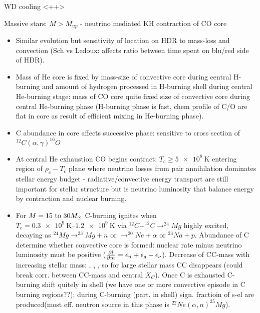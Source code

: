 \begin{frame}{WD cooling}
    <++>
\end{frame}

\begin{frame}{Massive stars: $M>M_{up}$ - neutrino mediated KH contraction of CO core}
    \begin{itemize}
        \item Similar evolution but sensitivity of location on HDR to mass-loss and convection (Sch vs Ledoux: affects ratio between time spent on blu/red side of HDR).
        \item Mass of He core is fixed by mass-size of convective core during central H-burning and amount of hydrogen processed in H-burning shell during central He-burning stage: mass of CO core quite fixed size of convective core during central He-burning phase (H-burning phase is fast, chem profile of C/O are flat in core as result of efficient mixing in He-burning phase).
        \item C abundance in core affects successive phase: sensitive to cross section of $^{12}C(\alpha,\gamma)^{16}O$
        \item At central He exhaustion CO begins contract; $T_c\geq\SI{5e8}{\kelvin}$ entering region of $\rho_c-T_c$ plane where neutrino losses from pair annihilation dominates stellar energy budget - radiative/convective energy transport are still important for stellar structure but is neutrino luminosity that balance energy by contraction and nuclear burning.
        \item For $M=\numrange{15}{30}\msun{}$ C-burning ignites when $T_c=\SIrange{0.3e9}{1.2e9}{\kelvin}$ via $^{12}C+^{12}C\to^{24}Mg$ highly excited, decaying as $^{24}Mg\to^{23}Mg+n$ or $\to^{20}Ne+\alpha$ or $^{23}Na+p$. Abundance of C determine whether convective core is formed: nuclear rate minus neutrino luminosity must be positive ($\PDy{m}{l}=\epsilon_n+\epsilon_g-\epsilon_{\nu}$). Decrease of CC-mass with increasing stellar mass: , , \xaumenta{\epsilon_{\nu}}, so for large stellar mass CC disappears (could break corr. between CC-mass and central $X_C$). Once C is exhausted C-burning shift quitely in shell (we have one or more convective episode in C burning regions??); during C-burning (part. in shell) sign. fractioin of s-el are produced(most eff. neutron source in this phase is $^{22}Ne(\alpha,n)^{25}Mg$).
    \end{itemize}
\end{frame}


